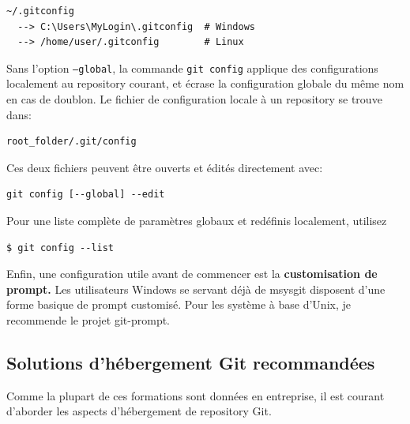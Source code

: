 \documentclass{../../common/tufte-latex/tufte-handout}
\begin{document}
\begin{lstlisting}[style=BashInputStyle]
  ~/.gitconfig
  --> C:\Users\MyLogin\.gitconfig  # Windows
  --> /home/user/.gitconfig        # Linux
\end{lstlisting}

Sans l'option \texttt{--global}, la commande \texttt{git config} applique des configurations localement au repository courant, et écrase la configuration globale du même nom en cas de doublon. Le fichier de configuration locale à un repository se trouve dans:

\begin{lstlisting}[style=BashInputStyle]
  root_folder/.git/config
\end{lstlisting}

\noindent Ces deux fichiers peuvent être ouverts et édités directement avec: 

\begin{lstlisting}[style=BashInputStyle]
  git config [--global] --edit
\end{lstlisting}

\noindent Pour une liste complète de paramètres globaux et redéfinis localement, utilisez

\begin{lstlisting}[style=BashInputStyle]
  $ git config --list
\end{lstlisting}

Enfin, une configuration utile avant de commencer est la \textbf{customisation de prompt.}
Les utilisateurs Windows se servant déjà de msysgit disposent d'une forme basique de prompt customisé. 
Pour les système à base d'Unix, je recommende le projet git-prompt.


\subsection{Solutions d'hébergement Git recommandées}

Comme la plupart de ces formations sont données en entreprise, il est courant d'aborder les aspects d'hébergement de repository Git.
\end{document}
